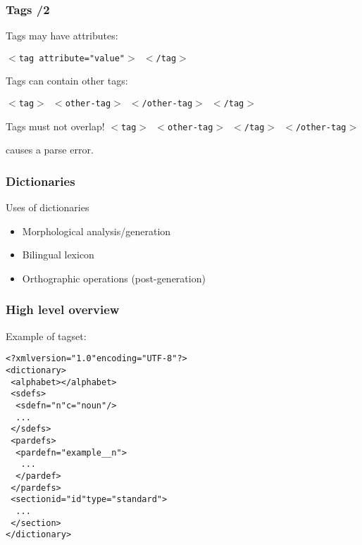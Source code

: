\documentclass{beamer} %
\begin{document}
\begin{frame}
  \frametitle{Tags /2}
  Tags may have attributes: 

  {\tt $<$tag attribute="value"$>$ $<$/tag$>$}

  Tags can contain other tags: 

  {\tt $<$tag$>$ $<$other-tag$>$ $<$/other-tag$>$ $<$/tag$>$}

  \begin{alertblock}{Tags must not overlap!}
    {\tt $<$tag$>$ $<$other-tag$>$ $<$/tag$>$ $<$/other-tag$>$}

   causes a parse error. 
  \end{alertblock}
\end{frame}



\begin{frame}
  \frametitle{Dictionaries}
  
  \begin{block}{Uses of dictionaries}
    \begin{itemize}
    \item Morphological analysis/generation
    \item Bilingual lexicon
    \item Orthographic operations (post-generation)
    \end{itemize}
  \end{block}

\end{frame}

\begin{frame}
  \frametitle{High level overview}

  \begin{exampleblock}{Example of tagset:}
    \begin{footnotesize}
    \begin{alltt}
      <?xml version="1.0" encoding="UTF-8"?>\\
      <dictionary>\\
      ~<alphabet></alphabet>\\
      ~<sdefs>\\
      ~~<sdef n="n" c="noun"/>\\
      ~~...\\
      ~</sdefs>\\
      ~<pardefs>\\
      ~~<pardef n="example\_\_n">\\
      ~~~...\\
      ~~</pardef>\\
      ~</pardefs>\\
      ~<section id="id" type="standard">\\
      ~~...\\
      ~</section>\\
      </dictionary>\\
    \end{alltt}
    \end{footnotesize}
\end{exampleblock}

\end{frame}
\end{document}

